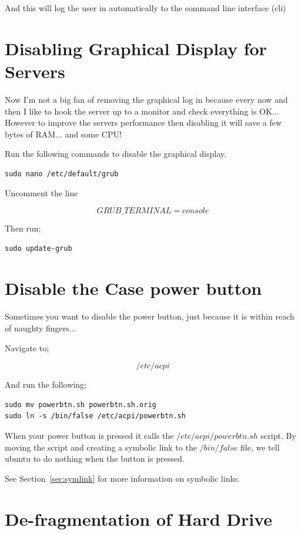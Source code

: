And this will log the user in automatically to the command line interface (cli)

\section{Disabling Graphical Display for Servers}

Now I'm not a big fan of removing the graphical log in because every now and then I like to hook the server up to a monitor and check everything is OK...  However to improve the servers performance then disabling it will save a few bytes of RAM... and some CPU!

Run the following commands to disable the graphical display.

\begin{lstlisting}
sudo nano /etc/default/grub
\end{lstlisting}

Uncomment the line

$$GRUB\_TERMINAL=console$$

Then run;

\begin{lstlisting}
sudo update-grub
\end{lstlisting}

\section{Disable the Case power button}

Sometimes you want to disable the power button, just because it is within reach of naughty fingers...


Navigate to;

$$
/etc/acpi
$$

And run the following;

\begin{lstlisting}
sudo mv powerbtn.sh powerbtn.sh.orig
sudo ln -s /bin/false /etc/acpi/powerbtn.sh
\end{lstlisting}

When your power button is pressed it calls the $/etc/acpi/powerbtn.sh$ script. By moving the script and creating a symbolic link to the $/bin/false$ file, we tell ubuntu to do nothing when the button is pressed.

See Section~\ref{sec:symlink} for more information on symbolic links.

\section{De-fragmentation of Hard Drive}

